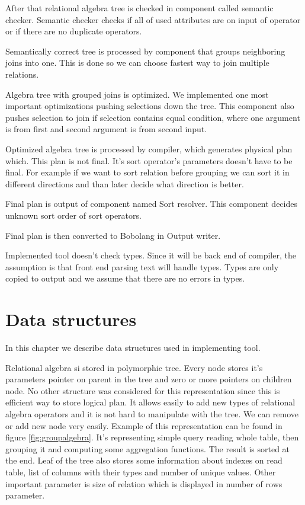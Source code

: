 After that relational algebra tree is checked in component called semantic checker. Semantic checker checks if all of used attributes are on input of operator or if there are no duplicate operators. 

Semantically correct tree is processed by component that groups neighboring joins into one. This is done so we can choose fastest way to join multiple relations.

Algebra tree with grouped joins is optimized. We implemented one most important optimizations pushing selections down the tree. This component also pushes selection to join if selection contains equal condition, where one argument is from first and second argument is from second input.

Optimized algebra tree is processed by compiler, which generates physical plan which. This plan is not final. It's sort operator's parameters doesn't have to be final. For example if we want to sort relation before grouping we can sort it in different directions and than later decide what direction is better.

Final plan is output of component named Sort resolver. This component decides unknown sort order of sort operators.

Final plan is then converted to Bobolang in Output writer.

Implemented tool doesn't check types. Since it will be back end of compiler, the assumption is that front end parsing text will handle types. Types are only copied to output and we assume that there are no errors in types.

\section{Data structures}

In this chapter we describe data structures used in implementing tool.

Relational algebra si stored in polymorphic tree. Every node stores it's parameters pointer on parent in the tree and zero or more pointers on children node. No other structure was considered for this representation since this is efficient way to store logical plan. It allows easily to add new types of relational algebra operators and it is not hard to manipulate with the tree. We can remove or add new node very easily. 
Example of this representation can be found in figure \ref{fig:groupalgebra}. It's representing simple query reading whole table, then grouping it and computing some aggregation functions. The result is sorted at the end. Leaf of the tree also stores some information about indexes on read table, list of columns with their types and number of unique values. Other important parameter is size of relation which is displayed in number of rows parameter.

